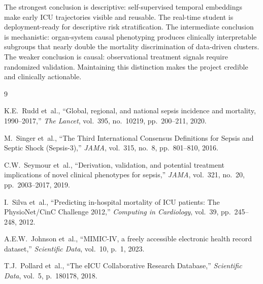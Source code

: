 \documentclass[conference,a4paper]{IEEEtran}
\begin{document}
The strongest conclusion is descriptive: self-supervised temporal embeddings make early ICU trajectories visible and reusable. The real-time student is deployment-ready for descriptive risk stratification. The intermediate conclusion is mechanistic: organ-system causal phenotyping produces clinically interpretable subgroups that nearly double the mortality discrimination of data-driven clusters. The weaker conclusion is causal: observational treatment signals require randomized validation. Maintaining this distinction makes the project credible and clinically actionable.


\begin{thebibliography}{9}

K.E.~Rudd et~al., ``Global, regional, and national sepsis incidence and mortality, 1990--2017,'' \emph{The Lancet}, vol.~395, no.~10219, pp.~200--211, 2020.

M.~Singer et~al., ``The Third International Consensus Definitions for Sepsis and Septic Shock (Sepsis-3),'' \emph{JAMA}, vol.~315, no.~8, pp.~801--810, 2016.

C.W.~Seymour et~al., ``Derivation, validation, and potential treatment implications of novel clinical phenotypes for sepsis,'' \emph{JAMA}, vol.~321, no.~20, pp.~2003--2017, 2019.

I.~Silva et~al., ``Predicting in-hospital mortality of ICU patients: The PhysioNet/CinC Challenge 2012,'' \emph{Computing in Cardiology}, vol.~39, pp.~245--248, 2012.

A.E.W.~Johnson et~al., ``MIMIC-IV, a freely accessible electronic health record dataset,'' \emph{Scientific Data}, vol.~10, p.~1, 2023.

T.J.~Pollard et~al., ``The eICU Collaborative Research Database,'' \emph{Scientific Data}, vol.~5, p.~180178, 2018.

\end{thebibliography}
\end{document}
